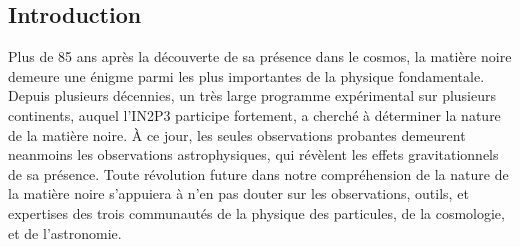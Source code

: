 \documentclass[12pt]{article}
\begin{document}


\subsection*{Introduction}

Plus de 85 ans après la découverte de sa présence dans le cosmos, la matière noire demeure une énigme parmi les plus importantes de la physique fondamentale. Depuis plusieurs décennies, un très large programme expérimental sur plusieurs continents, auquel l'IN2P3 participe fortement, a cherché à déterminer la nature de la matière noire. \`A ce jour, les seules observations probantes demeurent neanmoins les observations astrophysiques, qui révèlent les effets gravitationnels de sa présence. Toute révolution future dans notre compréhension de la nature de la matière noire s'appuiera à n'en pas douter sur les observations, outils, et expertises des trois communautés de la physique des particules, de la cosmologie, et de l'astronomie.
\end{document}
